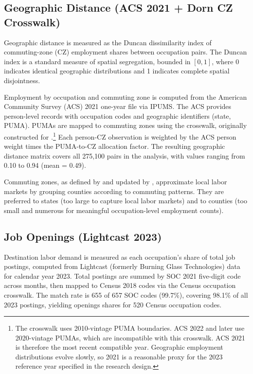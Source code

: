 \documentclass[12pt]{article}
\begin{document}
\subsection{Geographic Distance (ACS 2021 + Dorn CZ Crosswalk)}
\label{sec:data_geo}

Geographic distance is measured as the Duncan dissimilarity index of commuting-zone (CZ) employment shares between occupation pairs. The Duncan index is a standard measure of spatial segregation, bounded in $[0,1]$, where 0 indicates identical geographic distributions and 1 indicates complete spatial disjointness.

Employment by occupation and commuting zone is computed from the American Community Survey (ACS) 2021 one-year file via IPUMS. The ACS provides person-level records with occupation codes and geographic identifiers (state, PUMA). PUMAs are mapped to commuting zones using the \citet{dorn2009} crosswalk, originally constructed for \citet{autor2013}.\footnote{The crosswalk uses 2010-vintage PUMA boundaries. ACS 2022 and later use 2020-vintage PUMAs, which are incompatible with this crosswalk. ACS 2021 is therefore the most recent compatible year. Geographic employment distributions evolve slowly, so 2021 is a reasonable proxy for the 2023 reference year specified in the research design.} Each person-CZ observation is weighted by the ACS person weight times the PUMA-to-CZ allocation factor. The resulting geographic distance matrix covers all 275,100 pairs in the analysis, with values ranging from 0.10 to 0.94 (mean = 0.49).

Commuting zones, as defined by \citet{tolbert1996} and updated by \citet{dorn2009}, approximate local labor markets by grouping counties according to commuting patterns. They are preferred to states (too large to capture local labor markets) and to counties (too small and numerous for meaningful occupation-level employment counts).

\subsection{Job Openings (Lightcast 2023)}
\label{sec:data_openings}

Destination labor demand is measured as each occupation's share of total job postings, computed from Lightcast (formerly Burning Glass Technologies) data for calendar year 2023. Total postings are summed by SOC 2021 five-digit code across months, then mapped to Census 2018 codes via the Census occupation crosswalk. The match rate is 655 of 657 SOC codes (99.7\%), covering 98.1\% of all 2023 postings, yielding openings shares for 520 Census occupation codes.
\end{document}

